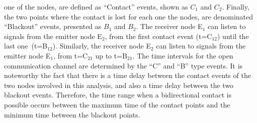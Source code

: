 \documentclass[crop]{CSLB}
\newcommand{\cetis}{nodes}
\begin{document}
one of the \cetis{}, are defined as ``Contact'' events, shown as $C_1$
and $C_2$.
%
Finally, the two points where the contact is lost for each one the
\cetis{}, are denominated ``Blackout'' events, presented as $B_1$ and
$B_2$.
%
The receiver node E$_1$ can listen to signals from the emitter node
E$_2$, from the first contact event (t=C$_{12}$) until the last
one (t=B$_{12}$).
%
Similarly, the receiver node E$_2$ can listen to signals from the
emitter node E$_1$, from t=C$_{21}$ up to t=B$_{21}$.
%
The time intervals for the open communication channel are determined
by the ``C'' and ``B'' type events.
%
It is noteworthy the fact that there is a time delay between the
contact events of the two \cetis{} involved in this analysis, and also
a time delay between the two blackout events.
%
Therefore, the time range when a bidirectional contact is possible
occurs between the maximum time of the contact points and the minimum
time between the blackout points.
\end{document}
